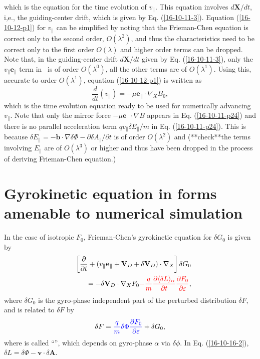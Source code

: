 \documentclass{article}
\newcommand{\tmcolor}[2]{{\color{#1}{#2}}}
\begin{document}
which is the equation for the time evolution of $v_{\parallel}$. This equation
involves $d\mathbf{X}/ d t$, i,e., the guiding-center drift, which is given by
Eq. (\ref{16-10-11-3}). Equation (\ref{16-10-12-p1}) for $v_{\parallel}$ can
be simplified by noting that the Frieman-Chen equation is correct only to the
second order, $O (\lambda^2)$, and thus the characteristics need to be correct
only to the first order $O (\lambda)$ and higher order terms can be dropped.
Note that, in the guiding-center drift $d\mathbf{X}/ d t$ given by Eq.
(\ref{16-10-11-3}), only the $v_{\parallel} \mathbf{e}_{\parallel}$ term in \
is of order $O (\lambda^0)$, all the other terms are of $O (\lambda^1)$. Using
this, accurate to order $O (\lambda^1)$, equation (\ref{16-10-12-p1}) is
written as
\begin{equation}
  \label{16-10-11-p24} \frac{d}{d t} (v_{\parallel}) = - \mu
  \mathbf{e}_{\parallel} \cdot \nabla_X B_0,
\end{equation}
which is the time evolution equation ready to be used for numerically
advancing $v_{\parallel}$. Note that only the mirror force $- \mu
\mathbf{e}_{\parallel} \cdot \nabla B$ appears in Eq. (\ref{16-10-11-p24}) and
there is no parallel acceleration term $q v_{\parallel} \delta E_{\parallel} /
m$ in Eq. (\ref{16-10-11-p24}). This is because $\delta E_{\parallel} =
-\mathbf{b} \cdot \nabla \delta \Phi - \partial \delta A_{\parallel} /
\partial t$ is of order $O (\lambda^2)$ and (**check**the terms involving
$E_{\parallel}$ are of $O (\lambda^3)$ or higher and thus have been dropped in
the process of deriving Frieman-Chen equation.)

\section{Gyrokinetic equation in forms amenable to numerical simulation}

In the case of isotropic $F_0$, Frieman-Chen's gyrokinetic equation for
$\delta G_0$ is given by
\begin{eqnarray}
  &  & \left[ \frac{\partial}{\partial t} + (v_{\parallel}
  \mathbf{e}_{\parallel} +\mathbf{V}_D + \delta \mathbf{V}_D) \cdot \nabla_X
  \right] \delta G_0 \nonumber\\
  &  & = - \delta \mathbf{V}_D \cdot \nabla_X F_0 \tmcolor{red}{- \frac{q}{m}
  \frac{\partial \langle \delta L \rangle_{\alpha}}{\partial t}
  \frac{\partial F_0}{\partial \varepsilon}},  \label{16-10-16-2}
\end{eqnarray}
where $\delta G_0$ is the gyro-phase independent part of the perturbed
distribution $\delta F$, and is related to $\delta F$ by
\begin{equation}
  \delta F = \tmcolor{blue}{\frac{q}{m} \delta \Phi \frac{\partial
  F_0}{\partial \varepsilon}} + \delta G_0,
\end{equation}
where \tmcolor{blue}{the first term} is called ``\tmcolor{blue}{the adiabatic
term}'', which depends on gyro-phase $\alpha$ via $\delta \phi$. In Eq.
(\ref{16-10-16-2}), $\delta L = \delta \Phi -\mathbf{v} \cdot \delta
\mathbf{A}$.
\end{document}

